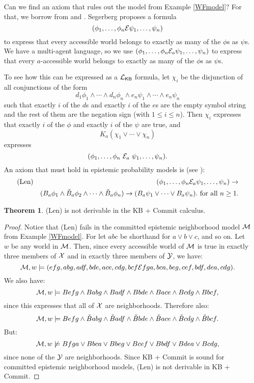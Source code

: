 \documentclass[12pt]{article}
\theoremstyle{definition}
\newtheorem{theorem}{Theorem}[section]
\newcommand{\M}{{\cal M}}      %
\newcommand{\Lang}{{\cal L}}   %
\newcommand{\KB}{{\mathsf{KB}}}                     %
\begin{document}
Can we find an axiom that rules out the model from 
Example \ref{WFmodel}? For that, we borrow
from \cite{Segerberg1971:qpiams} and \cite{Lenzen2003:kbasp}.
Segerberg proposes a formula
\[
  (\phi_1, \ldots, \phi_n {\cal E}\psi_1, \ldots, \psi_n)
\]
to express that every accessible world belongs to exactly as many of
the $\phi$s as $\psi$s. We have a multi-agent
language, so we use $(\phi_1, \ldots, \phi_n {\cal
E}_a \psi_1, \ldots, \psi_n)$ to express that every $a$-accessible
world belongs to exactly as many of the $\phi$s as $\psi$s.

To see how this can be expressed as a $\Lang_\KB$ formula, 
let $\chi_i$ be the disjunction of all conjunctions of the form
\[
  d_1 \phi_1 \land  \cdots \land d_n \phi_n 
  \land e_n \psi_1 \land \cdots \land e_n \psi_n
\]
such that exactly $i$ of the $d$s and exactly $i$ of the $e$s are 
the empty symbol string and the rest of them are the negation sign
(with $1 \leq i \leq n$). Then $\chi_i$ expresses that exactly $i$ 
of the $\phi$ and exactly $i$ of the $\psi$ are true, and 
\[
  K_a (\chi_1 \lor \cdots \lor \chi_n)
\]
expresses 
\[
 (\phi_1, \ldots, \phi_n \ {\cal E}_a \ \psi_1, \ldots, \psi_n). 
\]
An axiom that must hold in epistemic probability models is
(see \cite{Lenzen2003:kbasp}): 
\begin{eqnarray*}
\text{(Len)} & & 
(\phi_1, \ldots, \phi_n {\cal E}_a \psi_1, \ldots, \psi_n)
\rightarrow \\ 
  & & (B_a \phi_1 \land \check{B}_a \phi_2
\land  \cdots \land\check{B}_a \phi_n) 
\rightarrow 
(B_a\psi_1 \lor \cdots \lor B_a \psi_n). \text{ for all } n \geq 1.
\end{eqnarray*}

\begin{theorem}
(Len) is not derivable in the KB + Commit calculus. 
\end{theorem}
\begin{proof}
Notice that (Len) fails in the committed epistemic neighborhood
model $\M$ from Example \ref{WFmodel}. For let $abc$ be shorthand
for $a \lor b \lor c$, and so on. Let $w$ be any world in $\M$. Then,
since every accessible world of $\M$ is true in exactly three members
of ${\cal X}$ and in exactly three members of ${\cal Y}$, we have:
\[
 \M, w \models (efg, abg, adf, bde, ace, cdg, bcf {\cal E} 
fga, bca, beg, cef, bdf, dea, cdg). 
\]
We also have: 
\[
   \M, w \models Befg \land Babg \land Badf \land Bbde \land Bace \land Bcdg 
   \land Bbcf, 
\]
since this expresses that all of ${\cal X}$ are neighborhoods. 
Therefore also: 
\[
   \M, w \models Befg \land \check{B}abg \land \check{B}adf \land \check{B}bde 
        \land \check{B}ace \land \check{B}cdg \land \check{B}bcf.
\]
But: 
\[
   \M, w  \not\models Bfga \lor Bbca \lor Bbeg \lor Bcef \lor Bbdf \lor Bdea \lor Bcdg, 
\]
since none of the ${\cal Y}$ are neighborhoods. 
Since KB + Commit is sound for committed epistemic neighborhood models, 
(Len) is not derivable in KB + Commit. 
\end{proof}
\end{document}
